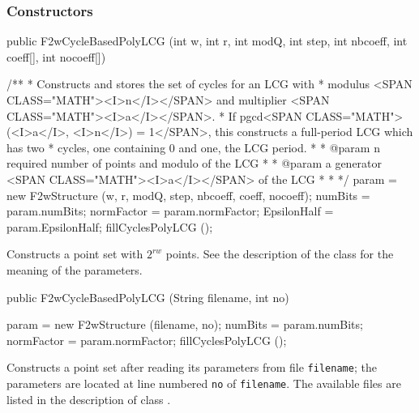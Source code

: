 \subsubsection*{Constructors}
\begin{code}

   public F2wCycleBasedPolyLCG (int w, int r, int modQ, int step, int nbcoeff,
                                int coeff[], int nocoeff[]) \begin{hide}
    /**
     * Constructs and stores the set of cycles for an LCG with
     *    modulus <SPAN CLASS="MATH"><I>n</I></SPAN> and multiplier <SPAN CLASS="MATH"><I>a</I></SPAN>.
     *   If pgcd<SPAN CLASS="MATH">(<I>a</I>, <I>n</I>) = 1</SPAN>, this constructs a full-period LCG which has two
     *   cycles, one containing 0 and one, the LCG period.
     *
     * @param n required number of points and modulo of the LCG
     *
     *    @param a generator <SPAN CLASS="MATH"><I>a</I></SPAN> of the LCG
     *
     *
     */
   {
      param = new F2wStructure (w, r, modQ, step, nbcoeff, coeff, nocoeff);
      numBits = param.numBits;
      normFactor = param.normFactor;
      EpsilonHalf = param.EpsilonHalf;
      fillCyclesPolyLCG ();
   }\end{hide}
\end{code}
 \begin{tabb}
 Constructs a point set with $2^{rw}$ points.  See the description of the class
 for the meaning of the parameters.
 \end{tabb}
\begin{code}

   public F2wCycleBasedPolyLCG (String filename, int no) \begin{hide}
   {
      param = new F2wStructure (filename, no);
      numBits = param.numBits;
      normFactor = param.normFactor;
      fillCyclesPolyLCG ();
   }\end{hide}
\end{code}
 \begin{tabb}
   Constructs a point set after reading its parameters from
   file \texttt{filename}; the parameters are located at line numbered \texttt{no}
   of \texttt{filename}. The available files are listed in the description of class
.
 \end{tabb}
